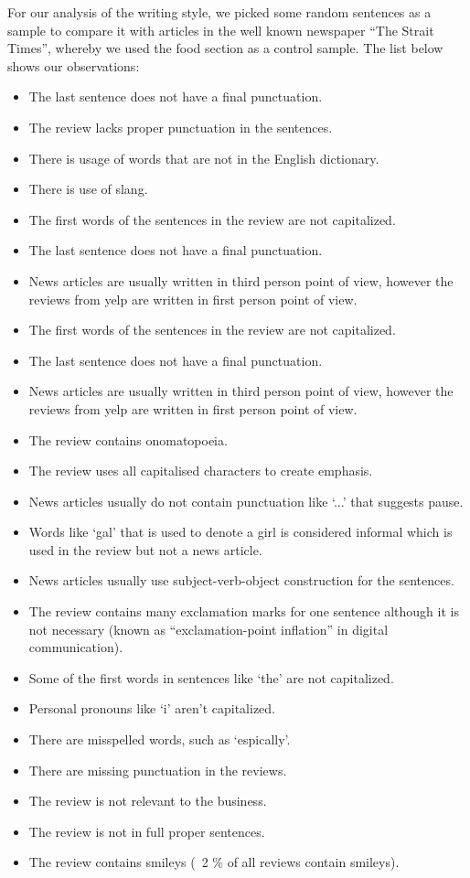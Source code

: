 For our analysis of the writing style, we picked some random sentences as a sample to compare it with articles in the well known newspaper “The Strait Times”, whereby we used the food section as a control sample. The list below shows our observations:
\linebreak

\begin{itemize}
    \item The last sentence does not have a final punctuation.
    \item The review lacks proper punctuation in the sentences.
    \item There is usage of words that are not in the English dictionary.
    \item There is use of slang. 
    \item The first words of the sentences in the review are not capitalized.
    \item The last sentence does not have a final punctuation.
    \item News articles are usually written in third person point of view, however the reviews from yelp are written in first person point of view.
    \item The first words of the sentences in the review are not capitalized.
    \item The last sentence does not have a final punctuation.
    \item News articles are usually written in third person point of view, however the reviews from yelp are written in first person point of view.
    \item The review contains onomatopoeia.
    \item The review uses all capitalised characters to create emphasis.
    \item News articles usually do not contain punctuation like ‘...’ that suggests pause.
    \item Words like ‘gal’ that is used to denote a girl is considered informal which is used in the review but not a news article.
    \item News articles usually use subject-verb-object construction for the sentences.
    \item The review contains many exclamation marks for one sentence although it is not necessary (known as “exclamation-point inflation” in digital communication).
    \item Some of the first words in sentences like ‘the’ are not capitalized.
    \item Personal pronouns like ‘i’ aren't capitalized.
    \item There are misspelled words, such as ‘espically’.
    \item There are missing punctuation in the reviews.
    \item The review is not relevant to the business.
    \item The review is not in full proper sentences.
    \item The review contains smileys (~2 \% of all reviews contain smileys).
\end{itemize}
